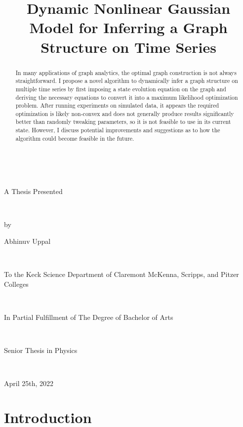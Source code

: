 \documentclass[12pt]{article}
\title{\Huge Dynamic Nonlinear Gaussian Model for Inferring a Graph Structure on Time Series}
\date{}
\theoremstyle{definition}
\begin{document}
\maketitle

\begin{center}
    
    $\;$
    
    {\huge A Thesis Presented

    $\;$ \newline

    by 

    Abhinuv Uppal 

    $\;$ \newline


    To the Keck Science Department
    of
    Claremont McKenna, Scripps, and Pitzer Colleges

    $\;$ \newline

    In Partial Fulfillment of
    The Degree of Bachelor of Arts

    $\;$ \newline

    Senior Thesis in Physics

    $\;$ \newline
    
    April 25th, 2022}


\end{center}

\newpage


\begin{abstract}
	In many applications of graph analytics, the optimal graph construction is not always straightforward. I propose a novel algorithm to dynamically infer a graph structure on multiple time series by first imposing a state evolution equation on the graph and deriving the necessary equations to convert it into a maximum likelihood optimization problem. After running experiments on simulated data, it appears the required optimization is likely non-convex and does not generally produce results significantly better than randomly tweaking parameters, so it is not feasible to use in its current state. However, I discuss potential improvements and suggestions as to how the algorithm could become feasible in the future.
\end{abstract}

\section{Introduction}
\label{sec:intro}
\end{document}
